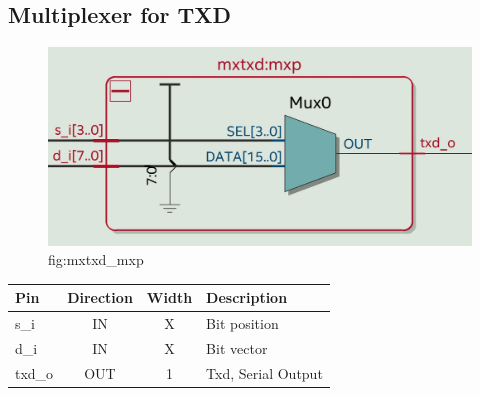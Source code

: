 \documentclass[12pt,a4 paper] {report}
\begin{document}
\subsection{Multiplexer for TXD}
\begin{figure}[h]
	\centering	
	\includegraphics[scale=0.2]{../png/mxtxd_mxp.png}
	\newline
	fig:mxtxd\_mxp\\
\end{figure}
\begin{center}
	\begin{tabular}{ | p{2cm} | c | c | p{5cm} |}
		\hline
		\textbf{Pin} & \textbf{Direction} & \textbf{Width} & \textbf{Description} \\
		\hline
		s\_i & IN & X & Bit position \\
		\hline
		d\_i & IN & X & Bit vector \\
		\hline
		txd\_o & OUT & 1 & Txd, Serial Output \\
		\hline	
		
	\end{tabular}
\end{center} 
\end{document}
